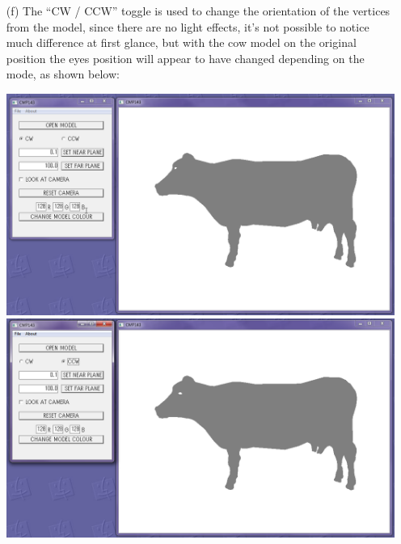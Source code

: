 \documentclass[12pt]{article}
\begin{document}
\begin{itemize}
\item[(f)] The ``CW / CCW'' toggle is used to change the orientation of the vertices from the model, since there are no light effects, it's not possible to notice much difference at first glance, but with the cow model on the original position the eyes position will appear to have changed depending on the mode, as shown below:
\begin{center}
	\includegraphics[scale=0.5]{3.png}
	\includegraphics[scale=0.5]{10.png}
\end{center}


\end{itemize}
\end{document}
